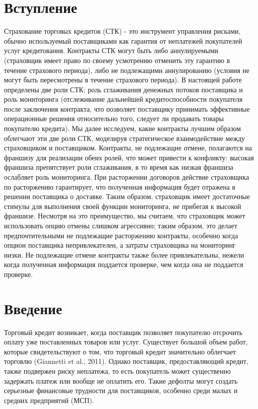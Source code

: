 \documentclass[a4paper,12pt]{article}
\begin{document}
\section{Вступление}
Страхование торговых кредитов (СТК) - это инструмент управления рисками, обычно используемый поставщиками как гарантия от неплатежей покупателей услуг кредитования. Контракты СТК могут быть либо аннулируемыми (страховщик имеет право по своему усмотрению отменить эту гарантию в течение страхового периода), либо не подлежащими аннулированию (условия не могут быть пересмотрены в течение страхового периода). В настоящей работе определены две роли СТК: роль сглаживания денежных потоков поставщика и роль мониторинга (отслеживание дальнейшей кредитоспособности покупателя после заключения контракта, что позволяет поставщику принимать эффективные операционные решения относительно того, следует ли продавать товары покупателю кредита). Мы далее исследуем, какие контракты  лучшим образом облегчают эти две роли СТК, моделируя стратегическое взаимодействие между страховщиком и поставщиком. Контракты, не подлежащие отмене, полагаются на франшизу для реализации обеих ролей, что может привести к конфликту: высокая франшиза препятствует роли сглаживания, в то время как низкая франшиза ослабляет роль мониторинга. При расторжении договоров действие страховщика по расторжению гарантирует, что полученная информация будет отражена в решении поставщика о доставке. Таким образом, страховщик имеет достаточные стимулы для выполнения своей функции мониторинга, не прибегая к высокой франшизе. Несмотря на это преимущество, мы считаем, что страховщик может использовать опцию отмены слишком агрессивно; таким образом, это делает предпочтительными не подлежащие расторжению контракты, особенно когда опцион поставщика непривлекателен, а затраты страховщика на мониторинг низки. Не подлежащие отмене контракты также более привлекательны, нежели когда полученная информация поддается проверке, чем когда она не поддается проверке.

\section{Введение}
Торговый кредит возникает, когда поставщик позволяет покупателю отсрочить оплату уже поставленных товаров или услуг. Существует большой объем работ, которые свидетельствуют о том, что торговый кредит значительно облегчает торговлю (Giannetti et al., 2011). Однако поставщик, предоставляющий кредит, также подвержен риску неплатежа, то есть покупатель может существенно задержать платеж или вообще не оплатить его. Такие дефолты могут создать серьезные финансовые трудности для поставщиков, особенно среди малых и средних предприятий (МСП).
\end{document}
